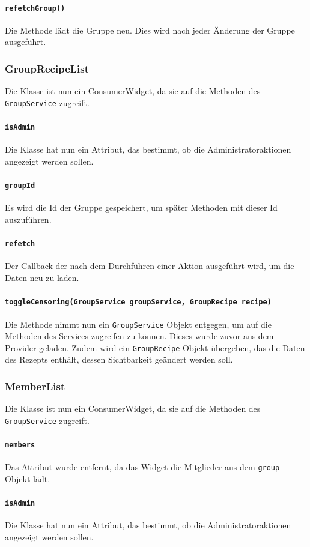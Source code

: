\documentclass{implementierungsheft}
\begin{document}
\paragraph{\texttt{refetchGroup()}}
Die Methode lädt die Gruppe neu. Dies wird nach jeder Änderung der Gruppe ausgeführt.
\subsubsection*{GroupRecipeList}
Die Klasse ist nun ein ConsumerWidget, da sie auf die Methoden des \texttt{GroupService} zugreift.
\paragraph{\texttt{isAdmin}}
Die Klasse hat nun ein Attribut, das bestimmt, ob die Administratoraktionen angezeigt werden sollen.
\paragraph{\texttt{groupId}}
Es wird die Id der Gruppe gespeichert, um später Methoden mit dieser Id auszuführen.
\paragraph{\texttt{refetch}}
Der Callback der nach dem Durchführen einer Aktion ausgeführt wird, um die Daten neu zu laden.
\paragraph{\texttt{toggleCensoring(GroupService groupService, GroupRecipe recipe)}}
Die Methode nimmt nun ein \texttt{GroupService} Objekt entgegen, um auf die Methoden des Services zugreifen zu können. Dieses wurde zuvor aus dem Provider geladen. Zudem wird ein \texttt{GroupRecipe} Objekt übergeben, das die Daten des Rezepts enthält, dessen Sichtbarkeit geändert werden soll.
\subsubsection*{MemberList}
Die Klasse ist nun ein ConsumerWidget, da sie auf die Methoden des \texttt{GroupService} zugreift.
\paragraph{\texttt{members}}
Das Attribut wurde entfernt, da das Widget die Mitglieder aus dem \texttt{group}-Objekt lädt.
\paragraph{\texttt{isAdmin}}
Die Klasse hat nun ein Attribut, das bestimmt, ob die Administratoraktionen angezeigt werden sollen.
\end{document}
